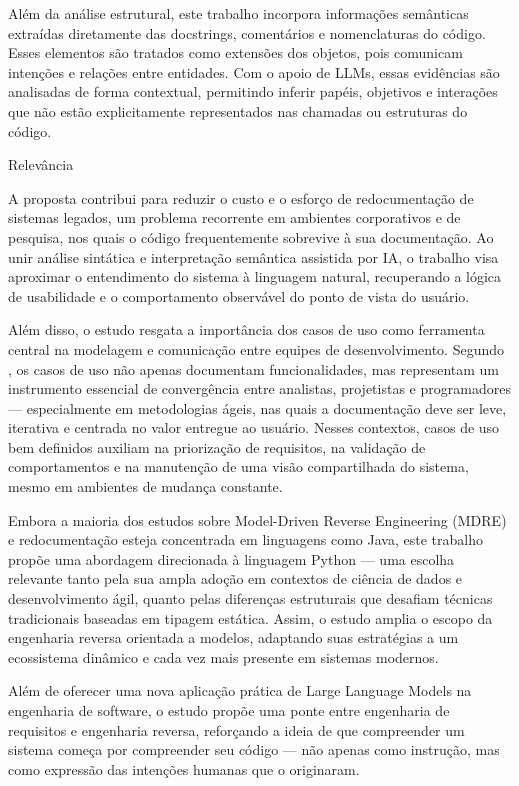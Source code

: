 \documentclass[12pt,a4paper]{article}
\begin{document}
Além da análise estrutural, este trabalho incorpora informações semânticas extraídas diretamente das docstrings, comentários e nomenclaturas do código. Esses elementos são tratados como extensões dos objetos, pois comunicam intenções e relações entre entidades. Com o apoio de LLMs, essas evidências são analisadas de forma contextual, permitindo inferir papéis, objetivos e interações que não estão explicitamente representados nas chamadas ou estruturas do código.

Relevância

A proposta contribui para reduzir o custo e o esforço de redocumentação de sistemas legados, um problema recorrente em ambientes corporativos e de pesquisa, nos quais o código frequentemente sobrevive à sua documentação. Ao unir análise sintática e interpretação semântica assistida por IA, o trabalho visa aproximar o entendimento do sistema à linguagem natural, recuperando a lógica de usabilidade e o comportamento observável do ponto de vista do usuário.

Além disso, o estudo resgata a importância dos casos de uso como ferramenta central na modelagem e comunicação entre equipes de desenvolvimento. Segundo \textcite{larman2002applying}, os casos de uso não apenas documentam funcionalidades, mas representam um instrumento essencial de convergência entre analistas, projetistas e programadores — especialmente em metodologias ágeis, nas quais a documentação deve ser leve, iterativa e centrada no valor entregue ao usuário. Nesses contextos, casos de uso bem definidos auxiliam na priorização de requisitos, na validação de comportamentos e na manutenção de uma visão compartilhada do sistema, mesmo em ambientes de mudança constante.

Embora a maioria dos estudos sobre Model-Driven Reverse Engineering (MDRE) e redocumentação esteja concentrada em linguagens como Java, este trabalho propõe uma abordagem direcionada à linguagem Python — uma escolha relevante tanto pela sua ampla adoção em contextos de ciência de dados e desenvolvimento ágil, quanto pelas diferenças estruturais que desafiam técnicas tradicionais baseadas em tipagem estática. Assim, o estudo amplia o escopo da engenharia reversa orientada a modelos, adaptando suas estratégias a um ecossistema dinâmico e cada vez mais presente em sistemas modernos.

Além de oferecer uma nova aplicação prática de Large Language Models na engenharia de software, o estudo propõe uma ponte entre engenharia de requisitos e engenharia reversa, reforçando a ideia de que compreender um sistema começa por compreender seu código — não apenas como instrução, mas como expressão das intenções humanas que o originaram.
\end{document}
